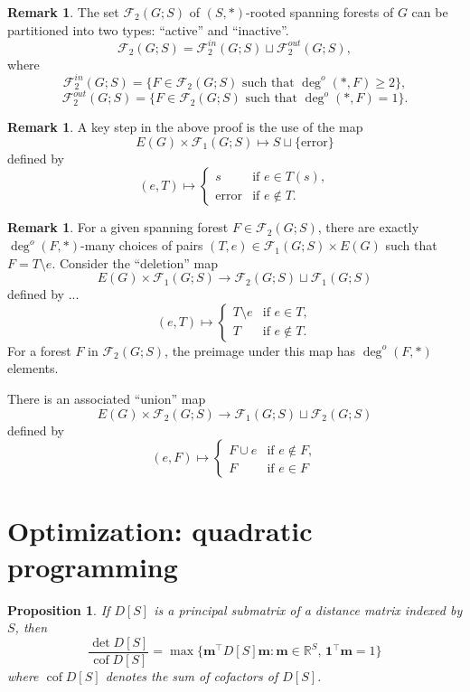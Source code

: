 \documentclass{amsart}
\newtheorem{prop}[thm]{Proposition}
\theoremstyle{definition}
\newtheorem{rmk}[thm]{Remark}
\newcommand{\RR}{\mathbb{R}}
\newcommand{\bone}{\mathbf{1}}
\newcommand{\boldm}{\mathbf{m}}
\newcommand{\tr}{\intercal}
\DeclareMathOperator{\cof}{cof}
\newcommand{\trees}{\mathcal{F}_1}
\newcommand{\forests}{\mathcal{F}}
\newcommand{\degout}{\deg^o}
\newcommand{\note}[1]{{\color{red} \sf $\diamondsuit$  {#1} $\diamondsuit$ }}
\begin{document}
\begin{rmk}
The set $\forests_2(G;S)$ of $(S,*)$-rooted spanning forests of $G$ can be partitioned into two types: ``active'' and ``inactive''.
\[
	\forests_2(G;S) = \forests_2^{in}(G;S) \sqcup \forests_2^{out}(G;S),
\]
where
\[
	\forests_2^{in}(G;S)  = \{ F \in \forests_2(G;S) \text{ such that } \deg^o(*,F) \geq 2\},
\]
$$
\forests_2^{out}(G;S)  = \{ F \in \forests_2(G;S) \text{ such that } \deg^o(*,F) = 1\}.
$$
\end{rmk}

\begin{rmk}
A key step in the above proof is the use of the map
\[
	E(G) \times \trees(G;S) \mapsto S \sqcup \{\text{error}\}
\]
defined by
\[
	(e, T) \mapsto \begin{cases}
		s &\text{if } e \in T(s), \\
		\text{error} &\text{if } e \not\in T .
	\end{cases}
\]
\end{rmk}

\begin{rmk}
For a given spanning forest
$F \in \forests_2(G;S)$,
there are exactly $\degout(F, *)$-many choices of pairs $(T,e) \in \trees(G;S) \times E(G)$ such that
$F = T \setminus e.$
Consider the ``deletion'' map
\[
	E(G) \times \trees(G;S) \to \forests_2(G;S) \sqcup \trees(G;S)
\]
defined by ...
\[
	(e, T) \mapsto \begin{cases}
	T \setminus e &\text{if } e\in T,\\
	T &\text{if } e\not\in T.
	\end{cases}
\]
For a forest $F$ in $\forests_2(G;S)$,
the preimage under this map has $\degout(F,*)$ elements.

There is an associated ``union'' map 
\[
	E(G) \times \forests_2(G;S) \longrightarrow \trees(G;S) \sqcup \forests_2(G;S)
\]
defined by
\[
	(e, F) \mapsto \begin{cases}
		F \cup e &\text{if } e \not\in F, \\
		F &\text{if } e \in F
	\end{cases}
\]
\end{rmk}

\section{Optimization: quadratic programming}
\label{sec:optimization}

\begin{prop}
If $D[S]$ is a principal submatrix of a distance matrix indexed by $S$, then 
\[
	\frac{\det D[S]}{\cof D[S]} = \max \{\boldm^\tr D[S] \boldm : \boldm \in \RR^S,\, \bone^\tr \boldm = 1 \}
\]
where $\cof D[S]$ denotes the sum of cofactors of $D[S]$.
\end{prop}
\end{document}
